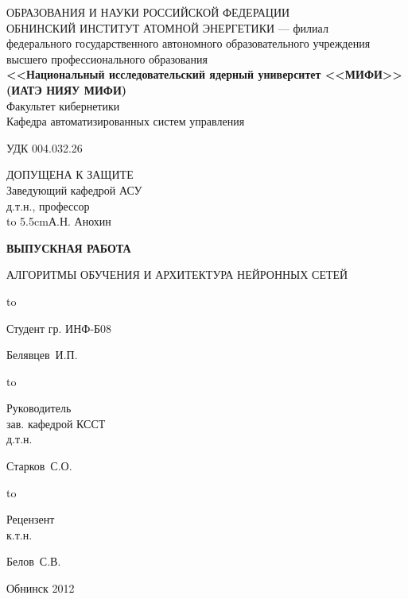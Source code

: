 \begin{titlepage}
\newpage

\begin{center}
{\small{} ОБРАЗОВАНИЯ И НАУКИ РОССИЙСКОЙ ФЕДЕРАЦИИ\\
ОБНИНСКИЙ ИНСТИТУТ АТОМНОЙ ЭНЕРГЕТИКИ --- филиал}\\
федерального государственного автономного образовательного учреждения\\
высшего профессионального образования\\
{\bf<<Национальный исследовательский ядерный университет <<МИФИ>>\\
(ИАТЭ НИЯУ МИФИ)}\\
\vspace{2em}
Факультет кибернетики\\
Кафедра автоматизированных систем управления
\end{center}
\vspace{2em}
УДК 004.032.26
\hfill
\parbox{5.5cm}
{
ДОПУЩЕНА К ЗАЩИТЕ\\
Заведующий кафедрой АСУ\\
д.т.н., профессор\\
\hbox to 5.5cm{\dotfill А.Н. Анохин}
}
\vspace{5em}
\begin{center}
\textbf{ВЫПУСКНАЯ РАБОТА}
\end{center}


\begin{center}
АЛГОРИТМЫ ОБУЧЕНИЯ И АРХИТЕКТУРА НЕЙРОННЫХ СЕТЕЙ
\end{center}

\vspace{6em}

\hbox to \textwidth
{\parbox{5 cm}{Студент гр. ИНФ-Б08}\dotfill \parbox{4 cm}{
\begin{flushright}Белявцев~И.П.\end{flushright}}}
\vspace{2em}

\hbox to \textwidth
{\parbox{5 cm}{Руководитель\\ зав. кафедрой КССТ\\ д.т.н.}\dotfill \parbox{4 cm}{
\begin{flushright}Старков~С.О.\end{flushright}}}
\vspace{2em}

\hbox to \textwidth
{\parbox{5 cm}{Рецензент\\ к.т.н.}\dotfill \parbox{4 cm}{
\begin{flushright}Белов~С.В.\end{flushright}}}

\vspace{\fill}

\begin{center}
Обнинск 2012
\end{center}

\end{titlepage}
